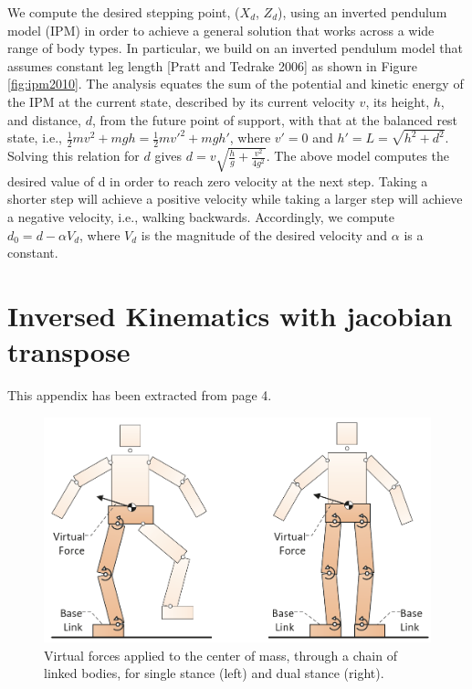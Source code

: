\documentclass[runningheads,a4paper,10pt]{llncs}
\begin{document}
We compute the desired stepping point, ($X_d$, $Z_d$), using an inverted pendulum model (IPM) in order to achieve a general solution that works across a wide range of body types. In particular, we build on an inverted pendulum model that assumes constant leg length [Pratt and Tedrake 2006] as shown in Figure \ref{fig:ipm2010}. The analysis equates the sum of the potential and kinetic energy of the IPM at the current state, described by its current velocity $v$, its height, $h$, and distance, $d$, from the future point of support, with that at the balanced rest state, i.e., $\frac{1}{2}mv^2+mgh=\frac{1}{2}mv'^2+mgh'$, where \(v'=0\) and \(h'=L=\sqrt{h^2+d^2}\). Solving this relation for $d$ gives $ d = v\sqrt{\frac{h}{g}+\frac{v^2}{4g^2}}$. The above model computes the desired value of d in order to reach zero velocity at the next step. Taking a shorter step will achieve a positive velocity while taking a larger step will achieve a negative velocity, i.e., walking backwards. Accordingly, we compute $d_0 = d - \alpha V_d$, where $V_d$ is the magnitude of the desired velocity and $\alpha$ is a constant.


\section{Inversed Kinematics with jacobian transpose}


This appendix has been extracted from \cite{geijtenbeek2012simple} page 4.
\vspace{5mm} %

\begin{figure}[h]
\centering
\includegraphics[width=0.5\columnwidth]{images/paper2012img.png}

\caption{Virtual forces applied to the center of mass, through a chain of linked bodies, for single stance (left) and dual stance (right).}
\label{fig:paper2012img}
\end{figure}
\end{document}
